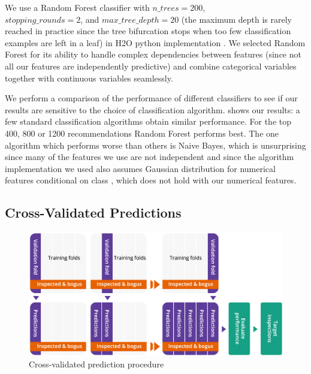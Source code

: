 We use a Random Forest \cite{liaw2002classification} classifier with $n\_trees=200$,\\ $stopping\_rounds=2$, and $max\_tree\_depth=20$ (the maximum depth is rarely reached in practice since the tree bifurcation stops when too few classification examples are left in a leaf) in H2O python implementation \cite{h2o_Python_module}. We selected Random Forest for its ability to handle complex dependencies between features (since not all our features are independently predictive) and combine categorical variables together with continuous variables seamlessly. 

We perform a comparison of the performance of different classifiers to see if our results are sensitive to the choice of classification algorithm.  shows our results: a few  standard classification algorithms obtain similar performance. For the top 400, 800 or 1200 recommendations Random Forest performs best. The one algorithm which performs worse than others is Naive Bayes, which is unsurprising since many of the features we use are not independent and since the algorithm implementation we used also assumes Gaussian distribution for numerical features conditional on class \cite{h2o_NaiveBayes}, which does not hold with our numerical features.

\subsection{Cross-Validated Predictions}
\label{subsec:cvp}
\begin{figure}
  \includegraphics[width=1\columnwidth]{figures/CrossValidatedPrediction.png}
  \caption{Cross-validated prediction procedure}
  \label{fig:crossvalidation}
\end{figure}

